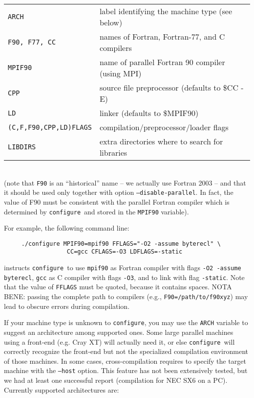 \documentclass[12pt,a4paper]{article}
\def\configure{\texttt{configure}}
\begin{document}
\begin{tabular}{ll}
\texttt{ARCH}& label identifying the machine type (see below)\\
\texttt{F90, F77, CC} &names of Fortran, Fortran-77, and C compilers\\
\texttt{MPIF90} &       name of parallel Fortran 90 compiler (using MPI)\\
\texttt{CPP} &          source file preprocessor (defaults to \$CC -E)\\
\texttt{LD} &           linker (defaults to \$MPIF90)\\
\texttt{(C,F,F90,CPP,LD)FLAGS}& compilation/preprocessor/loader flags\\
\texttt{LIBDIRS}&     extra directories where to search for libraries\\
\end{tabular}\\
(note that \texttt{F90} is an ``historical'' name -- we actually use
Fortran 2003 -- and that it should be used only together with option
\texttt{--disable-parallel}. In fact, the value of F90 must be
consistent with the parallel Fortran compiler which is determined by 
\configure\ and stored in the \texttt{MPIF90} variable).

For example, the following command line:
\begin{verbatim}
     ./configure MPIF90=mpif90 FFLAGS="-O2 -assume byterecl" \
                  CC=gcc CFLAGS=-O3 LDFLAGS=-static
\end{verbatim}
instructs \configure\ to use \texttt{mpif90} as Fortran compiler
with flags \texttt{-O2 -assume byterecl}, \texttt{gcc} as C compiler with
flags \texttt{-O3}, and to link with flag \texttt{-static}.
Note that the value of \texttt{FFLAGS} must be quoted, because it contains
spaces. NOTA BENE: passing the complete path to compilers (e.g.,
\texttt{F90=/path/to/f90xyz}) may lead to obscure errors during
compilation.

If your machine type is unknown to \configure, you may use the
\texttt{ARCH}
variable to suggest an architecture among supported ones. Some large
parallel machines using a front-end (e.g. Cray XT) will actually
need it, or else \configure\ will correctly recognize the front-end
but not the specialized compilation environment of those machines.
In some cases, cross-compilation requires to specify the target machine with the
\texttt{--host} option. This feature has not been extensively
tested, but we had at least one successful report (compilation
for NEC SX6 on a PC). Currently supported architectures are:
\end{document}
